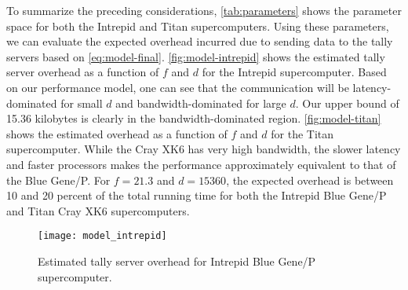 \documentclass[3p]{elsarticle}
\begin{document}
To summarize the preceding considerations, \autoref{tab:parameters} shows the
parameter space for both the Intrepid and Titan supercomputers. Using these
parameters, we can evaluate the expected overhead incurred due to sending data
to the tally servers based on
\eqref{eq:model-final}. \autoref{fig:model-intrepid} shows the estimated tally
server overhead as a function of $f$ and $d$ for the Intrepid
supercomputer. Based on our performance model, one can see that the
communication will be latency-dominated for small $d$ and bandwidth-dominated
for large $d$. Our upper bound of 15.36 kilobytes is clearly in the
bandwidth-dominated region. \autoref{fig:model-titan} shows the estimated
overhead as a function of $f$ and $d$ for the Titan supercomputer. While the
Cray XK6 has very high bandwidth, the slower latency and faster processors makes
the performance approximately equivalent to that of the Blue Gene/P. For $f =
21.3$ and $d = 15360$, the expected overhead is between 10 and 20 percent of the
total running time for both the Intrepid Blue Gene/P and Titan Cray XK6
supercomputers.

\begin{table}[htb]
\end{table}


\begin{figure}[htb]
  \centering
  \texttt{[image: model\_intrepid]}
  \caption{Estimated tally server overhead for Intrepid Blue Gene/P
    supercomputer.}
  \label{fig:model-intrepid}
\end{figure}
\end{document}
